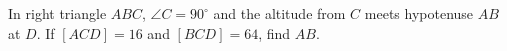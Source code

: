 In right triangle $ABC$, $\angle C=90^\circ$ and the altitude from $C$ meets hypotenuse $AB$ at $D$. If $[ACD]=16$ and $[BCD]=64$, find $AB$.
